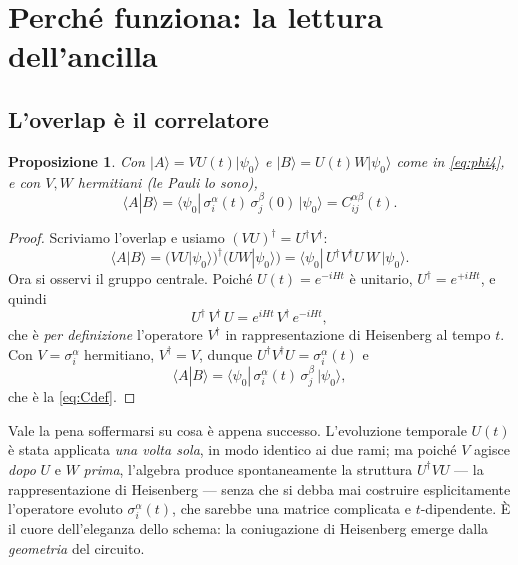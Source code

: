 \documentclass[11pt,a4paper]{article}
\newtheorem{proposizione}{Proposizione}
\begin{document}
\section{Perché funziona: la lettura dell'ancilla}

\subsection{L'overlap è il correlatore}

\begin{proposizione}
Con $|A\rangle=VU(t)|\psi_0\rangle$ e $|B\rangle=U(t)W|\psi_0\rangle$ come in \eqref{eq:phi4},
e con $V,W$ hermitiani (le Pauli lo sono),
\begin{equation}
\langle A|B\rangle=\langle\psi_0|\,\sigma_i^\alpha(t)\,\sigma_j^\beta(0)\,|\psi_0\rangle
= C_{ij}^{\alpha\beta}(t).
\end{equation}
\end{proposizione}

\begin{proof}
Scriviamo l'overlap e usiamo $(VU)^\dagger=U^\dagger V^\dagger$:
\begin{equation}
\langle A|B\rangle=\big(VU|\psi_0\rangle\big)^\dagger\big(UW|\psi_0\rangle\big)
=\langle\psi_0|\,U^\dagger V^\dagger U\,W\,|\psi_0\rangle .
\end{equation}
Ora si osservi il gruppo centrale. Poiché $U(t)=e^{-iHt}$ è unitario, $U^\dagger=e^{+iHt}$, e
quindi
\begin{equation}
U^\dagger\,V^\dagger\,U = e^{iHt}\,V^\dagger\,e^{-iHt},
\end{equation}
che è \emph{per definizione} l'operatore $V^\dagger$ in rappresentazione di Heisenberg al tempo
$t$. Con $V=\sigma_i^\alpha$ hermitiano, $V^\dagger=V$, dunque
$U^\dagger V^\dagger U=\sigma_i^\alpha(t)$ e
\begin{equation}
\langle A|B\rangle=\langle\psi_0|\,\sigma_i^\alpha(t)\,\sigma_j^\beta\,|\psi_0\rangle,
\end{equation}
che è la \eqref{eq:Cdef}.
\end{proof}

Vale la pena soffermarsi su cosa è appena successo. L'evoluzione temporale $U(t)$ è stata
applicata \emph{una volta sola}, in modo identico ai due rami; ma poiché $V$ agisce
\emph{dopo} $U$ e $W$ \emph{prima}, l'algebra produce spontaneamente la struttura
$U^\dagger V U$ --- la rappresentazione di Heisenberg --- senza che si debba mai costruire
esplicitamente l'operatore evoluto $\sigma_i^\alpha(t)$, che sarebbe una matrice complicata e
$t$-dipendente. È il cuore dell'eleganza dello schema: la coniugazione di Heisenberg emerge
dalla \emph{geometria} del circuito.
\end{document}
